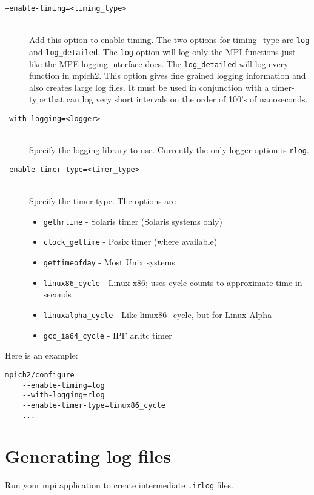 \documentclass[dvipdfm,11pt]{article}
\begin{document}
\begin{description}
\item[\texttt{--enable-timing=<timing\_type>}]\mbox{}\\
Add this option to enable timing.  The two options for timing\_type are 
\texttt{log} and \texttt{log\_detailed}.  The \texttt{log} option will log 
only the MPI functions just like the MPE logging interface does.  The 
\texttt{log\_detailed} will log every function in mpich2.  This option gives 
fine grained logging information and also creates large log files.  It must 
be used in conjunction with a timer-type that can log very short intervals 
on the order of 100's of nanoseconds.

\item[\texttt{--with-logging=<logger>}]\mbox{}\\
Specify the logging library to use.  Currently the only logger option is \texttt{rlog}.

\item[\texttt{--enable-timer-type=<timer\_type>}]\mbox{}\\
Specify the timer type.  The options are
\begin{itemize}
\item \texttt{gethrtime} -
Solaris timer (Solaris systems only)
\item \texttt{clock\_gettime} -
Posix timer (where available)
\item \texttt{gettimeofday} -
Most Unix systems
\item \texttt{linux86\_cycle} -
Linux x86; uses cycle counts to approximate time in seconds
\item \texttt{linuxalpha\_cycle} -
Like linux86\_cycle, but for Linux Alpha
\item \texttt{gcc\_ia64\_cycle} -
IPF ar.itc timer
\end{itemize}
\end{description}

Here is an example:
\begin{verbatim}
mpich2/configure
    --enable-timing=log
    --with-logging=rlog
    --enable-timer-type=linux86_cycle
    ...
\end{verbatim}

\section{Generating log files}
\label{sec:genlogs}
Run your mpi application to create intermediate \texttt{.irlog} files.
\end{document}
